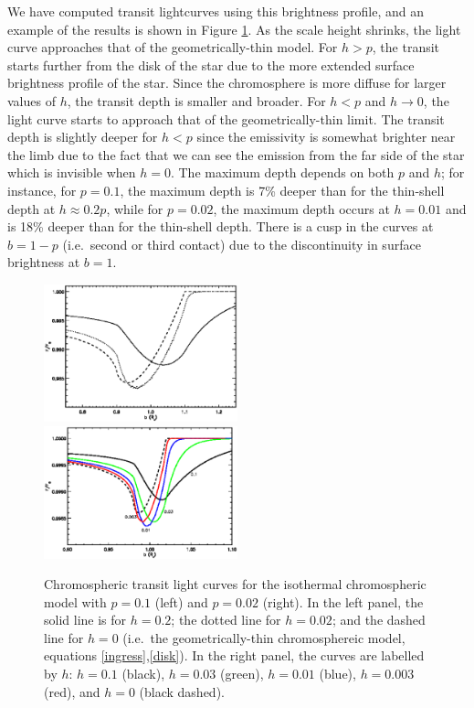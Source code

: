 \documentclass[manuscript]{aastex}
\begin{document}
We have computed transit lightcurves using this brightness
profile, and an example of the results is shown in Figure
\ref{fig04}.  As the scale height shrinks, the light
curve approaches that of the geometrically-thin model.
For $h > p$, the transit starts further from the disk of
the star due to the more extended surface brightness profile
of the star.  Since the chromosphere is more diffuse for
larger values of $h$, the transit depth is smaller and
broader.  For $h < p$ and $h \rightarrow 0$, the light curve 
starts  to approach that of the geometrically-thin limit.
The transit depth is slightly deeper for $h<p$ since the
emissivity is somewhat brighter near the limb due to
the fact that we can see the emission from the far side
of the star which is invisible when $h=0$.  The maximum
depth depends on both $p$ and $h$; for instance, for 
$p=0.1$, the maximum depth is 7\% deeper than for
the thin-shell depth at $h \approx 0.2 p$, while
for $p=0.02$, the maximum depth occurs at $h=0.01$
and is 18\% deeper than for the thin-shell depth.
There is a cusp in the curves at $b=1-p$ (i.e.\ second or third 
contact) due to the discontinuity in surface brightness at 
$b=1$.

\begin{figure}

\includegraphics[width=0.5\textwidth]{lc_h.1_p.1.eps}
\includegraphics[width=0.5\textwidth]{plot_3d_p.02.eps}
\caption{Chromospheric transit light curves for the
isothermal chromospheric model with $p=0.1$ (left) and
$p=0.02$ (right).   In the left panel, the
solid line is for $h=0.2$; the dotted line for $h=0.02$;
and the dashed line for $h=0$ (i.e.\ the geometrically-thin
chromosphereic model, equations \ref{ingress},\ref{disk}).
In the right panel, the curves are labelled by $h$:
$h=0.1$ (black), $h=0.03$ (green), $h=0.01$ (blue),
$h=0.003$ (red), and $h=0$ (black dashed).}
\label{fig04}
\end{figure}
\end{document}
